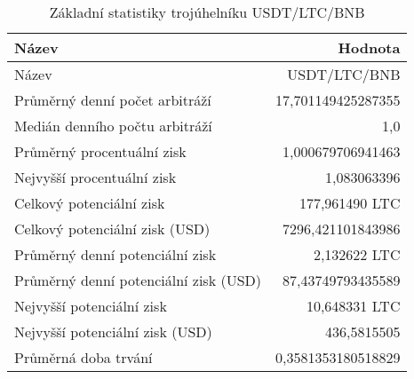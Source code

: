 \begin{table}\centering
\caption{Základní statistiky trojúhelníku USDT/LTC/BNB}
\label{USDTLTCBNB_stats}
\begin{tabular}{|| l | r ||}
\hline Název & Hodnota \\ 
\hline\hline Název & USDT/LTC/BNB \\ 
\hline Průměrný denní počet arbitráží & 17,701149425287355 \\ 
\hline Medián denního počtu arbitráží & 1,0 \\ 
\hline Průměrný procentuální zisk & 1,000679706941463 \\ 
\hline Nejvyšší procentuální zisk & 1,083063396 \\ 
\hline Celkový potenciální zisk & 177,961490 LTC \\ 
\hline Celkový potenciální zisk (USD) & 7296,421101843986 \\ 
\hline Průměrný denní potenciální zisk & 2,132622 LTC \\ 
\hline Průměrný denní potenciální zisk (USD) & 87,43749793435589 \\ 
\hline Nejvyšší potenciální zisk & 10,648331 LTC \\ 
\hline Nejvyšší potenciální zisk (USD) & 436,5815505 \\ 
\hline Průměrná doba trvání & 0,3581353180518829 \\ 
\hline
\end{tabular}
\end{table}